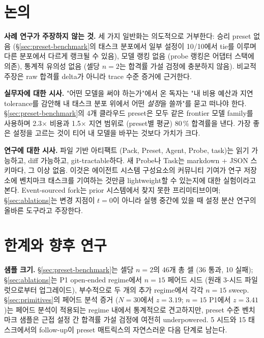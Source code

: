 \documentclass[11pt,a4paper]{article}
\begin{document}
\section{논의}
\label{sec:discussion}

\textbf{사례 연구가 주장하지 않는 것.} 세 가지 일반화는 의도적으로
거부한다: 승리 preset 없음 (\S\ref{sec:preset-benchmark}의 태스크 분포에서
일부 설정이 10/10에서 tie를 이루며 다른 분포에서 다르게 랭크될 수 있음),
모델 랭킹 없음 (probe 랭킹은 어댑터 스택에 의존), 통계적 유의성 없음
(셀당 $n = 2$는 합격률 가설 검정에 충분하지 않음). 비교적 주장은 raw
합격률 delta가 아니라 trace 수준 증거에 근거한다.

\textbf{실무자에 대한 시사.} "어떤 모델을 써야 하는가"에서 온 독자는
"내 비용 예산과 지연 tolerance를 감안해 내 태스크 분포 위에서 어떤
\emph{설정}을 쓸까"를 묻고 떠나야 한다. \S\ref{sec:preset-benchmark}의
4개 클라우드 preset은 모두 같은 frontier 모델 family를 사용하며 2.3$\times$
비용과 1.5$\times$ 지연 범위로 (preset별 평균) 80\,\%
합격률을 낸다. 가장
좋은 설정을 고르는 것이 티어 내 모델을 바꾸는 것보다 가치가 크다.

\textbf{연구에 대한 시사.} 파일 기반 아티팩트 (Pack, Preset, Agent, Probe,
task)는 읽기 가능하고, diff 가능하고, git-tractable하다. 새 Probe나
Task는 markdown + JSON 스키마다, 그 이상 없음. 이것은 에이전트
시스템 구성요소의 커뮤니티 기여가 연구 저장소에 벤치마크 태스크를
기여하는 것만큼 lightweight할 수 있는지에 대한 실험이라고 본다.
Event-sourced fork는 prior 시스템에서 찾지 못한 프리미티브이며;
\S\ref{sec:ablations}는 변경 지점이 $t=0$이 아니라 실행 중간에 있을
때 설정 분산 연구의 올바른 도구라고 주장한다.

\section{한계와 향후 연구}
\label{sec:limitations}

\textbf{샘플 크기.} \S\ref{sec:preset-benchmark}는 셀당 $n = 2$의 46개 총
셀 (36 통과, 10 실패); \S\ref{sec:ablations}는 P1 open-ended regime에서
$n=15$ 페어드 시드 (원래 3-시드 파일럿으로부터 업그레이드), 부수적으로
두 개의 추가 regime에서 각각 $n=15$ sweep. \S\ref{sec:primitives}의 페어드
분석 증거 ($N=30$에서 $z=3.19$; $n=15$ P1에서 $z=3.41$)는 페어드 분석이
적용되는 regime 내에서 통계적으로 견고하지만, preset 수준 벤치마크
샘플은 근접 설정 간 합격률 가설 검정에 여전히 underpowered. 5
시드와 15 태스크에서의 follow-up이 preset 매트릭스의 자연스러운
다음 단계로 남는다.
\end{document}
